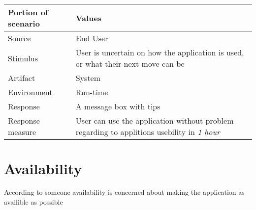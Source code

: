 \begin{itemize}
        \begin{tabular}{| l | p{7cm} |}
            \hline
            \rowcolor[gray]{0.8}
            \textbf{Portion of scenario} & \textbf{Values} \\
            \hline
            Source & End User \\
            Stimulus & User is uncertain on how the application is used, or what their next move can be \\
            Artifact & System \\
            Environment & Run-time \\
            Response & A message box with tips \\
            Response measure  & User can use the application without problem regarding to applitions usebility in \emph{1 hour}\\
            \hline
        \end{tabular}
\end{itemize}

\section{Availability}
According to someone availability is concerned about making the application as availible as possible

